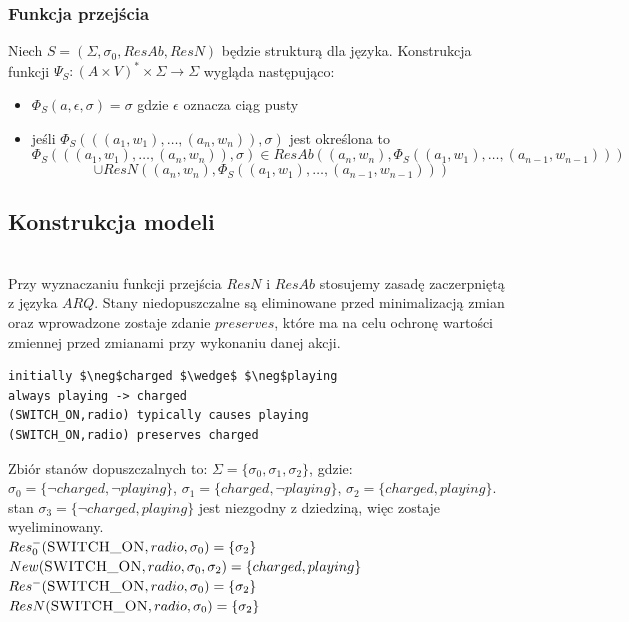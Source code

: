 \documentclass{article}
\begin{document}
\subsubsection{Funkcja przejścia}
Niech $S=(\Sigma,\sigma_{0},ResAb,ResN)$ będzie strukturą dla języka. Konstrukcja funkcji $\Psi_{S} : (A \times V)^{*} \times \Sigma \to \Sigma$ wygląda następująco:
\begin{itemize}
	\item $\Phi_{S}(a,\epsilon,\sigma)=\sigma$ gdzie $\epsilon$ oznacza ciąg pusty
	\item jeśli $\Phi_{S}(((a_{1}, w_{1}), \dots, (a_{n}, w_{n})),\sigma)$ jest określona to
	\[\Phi_{S}(((a_{1}, w_{1}), \dots, (a_{n}, w_{n})),\sigma) \in ResAb((a_{n}, w_{n}), \Phi_{S}((a_{1}, w_{1}),\dots,(a_{n-1}, w_{n-1}))) \]
	\[ \cup ResN((a_{n}, w_{n}), \Phi_{S}((a_{1}, w_{1}),\dots,(a_{n-1}, w_{n-1})))\]
\end{itemize}
\subsection{Konstrukcja modeli}\mbox{}\\
Przy wyznaczaniu funkcji przejścia $ResN$ i $ResAb$ stosujemy zasadę zaczerpniętą z języka $ARQ$. Stany niedopuszczalne są eliminowane przed minimalizacją zmian oraz wprowadzone zostaje zdanie $preserves$, które ma na celu ochronę wartości zmiennej przed  zmianami przy wykonaniu danej akcji.\\

\bigskip
{}
\begin{lstlisting}[mathescape=true]
initially $\neg$charged $\wedge$ $\neg$playing 
always playing -> charged
(SWITCH_ON,radio) typically causes playing
(SWITCH_ON,radio) preserves charged 
\end{lstlisting}

Zbiór stanów dopuszczalnych to: 
$\Sigma=\{\sigma_{0},\sigma_{1},\sigma_{2}\}$, gdzie:\\
$\sigma_{0}=\{\neg charged,\neg playing\}$, $\sigma_{1}=\{charged, \neg playing\}$, $\sigma_{2}=\{charged, playing\}$.\\

stan $\sigma_{3}=\{\neg charged, playing\}$ jest niezgodny z dziedziną, więc zostaje wyeliminowany.\\

$Res_{0}^{-}(\textsc{SWITCH\_ON},radio,\sigma_{0})=\{\sigma_{2}\}$\\
$New(\textsc{SWITCH\_ON},radio,\sigma_{0},\sigma_{2})=\{charged, playing\}$\\
$Res^{-}(\textsc{SWITCH\_ON},radio,\sigma_{0})=\{\sigma_{2}\}$\\
$ResN(\textsc{SWITCH\_ON},radio,\sigma_{0})=\{\sigma_{2}\}$\\ 
\end{document}
